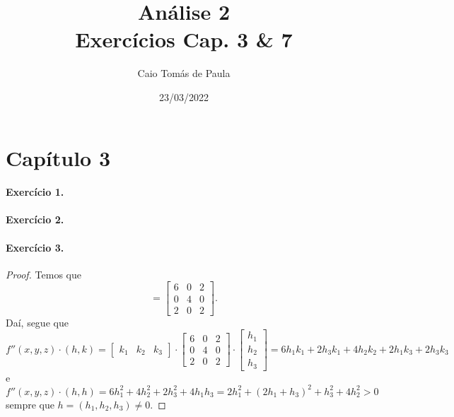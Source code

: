 \documentclass[12pt,a4paper]{article}
\title{\textbf{Análise 2}\\ Exercícios Cap. 3 \& 7}
\author{Caio Tomás de Paula}
\date{23/03/2022}
\begin{document}
\maketitle

\section{Capítulo 3}

\paragraph{Exercício 1.}
%

%
\paragraph{Exercício 2.}
%

%
\paragraph{Exercício 3.}
%
\begin{proof}
    Temos que
    \begin{equation*}
        [f''(x,y,z)] = 
        \begin{bmatrix}
            6 & 0 & 2 \\
            0 & 4 & 0 \\
            2 & 0 & 2
        \end{bmatrix}.
    \end{equation*}
    Daí, segue que
    \begin{equation*}
        f''(x,y,z)\cdot (h,k) = 
        \begin{bmatrix}
            k_1 & k_2 & k_3
        \end{bmatrix}\cdot
        \begin{bmatrix}
            6 & 0 & 2 \\
            0 & 4 & 0 \\
            2 & 0 & 2
        \end{bmatrix}\cdot
        \begin{bmatrix}
            h_1 \\
            h_2 \\
            h_3
        \end{bmatrix} =
        6h_1k_1 + 2h_3k_1 + 4h_2k_2 + 2h_1k_3 + 2h_3k_3 
    \end{equation*}
    e
    \begin{equation*}
        f''(x,y,z) \cdot (h,h) = 6h_1^2 + 4h_2^2 + 2h_3^2 + 4h_1h_3
                               = 2h_1^2 + (2h_1 + h_3)^2 + h_3^2 + 4h_2^2 > 0
    \end{equation*}
    sempre que $h = (h_1, h_2, h_3) \neq 0$.
\end{proof}
%
\end{document}
